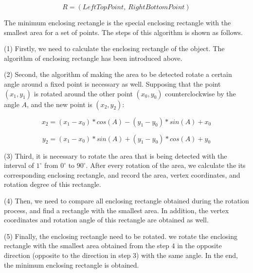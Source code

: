 \documentclass[22pt, UTF8]{article}
\numberwithin{figure}{section}
\numberwithin{table}{section}
\numberwithin{equation}{section} %
\begin{document}
\vspace{-4mm} %
\begin{equation} %
R = (LeftTopPoint,\ RightBottomPoint)
\end{equation}

\setlength\parindent{2em} The minimum enclosing rectangle is the special enclosing rectangle with the smallest area for a set of points. The steps of this algorithm is shown as follows.

\setlength\parindent{2em} (1) Firstly, we need to calculate the enclosing rectangle of the object. The algorithm of enclosing rectangle has been introduced above.

\setlength\parindent{2em} (2) Second, the algorithm of making the area to be detected rotate a certain angle around a fixed point is necessary as well. Supposing that the point $(x_{1}, y_{1})$ is rotated around the other point $(x_{0}, y_{0})$ counterclockwise by the angle $A$, and the new point is $(x_{2}, y_{2})$:

\vspace{-4mm} %
\begin{equation}
x_{2} = (x_{1} - x_{0}) * cos(A) - (y_{1} - y_{0}) * sin(A) + x_{0}
\end{equation}

\vspace{-4mm} %
\begin{equation}
y_{2} = (x_{1} - x_{0}) * sin(A) + (y_{1} - y_{0}) * cos(A) + y_{0}
\end{equation}

\setlength\parindent{2em} (3) Third, it is necessary to rotate the area that is being detected with the interval of $1^{\circ}$ from $0^{\circ}$ to $90^{\circ}$. After every rotation of the area, we calculate the its corresponding enclosing rectangle, and record the area, vertex coordinates, and rotation degree of this rectangle.

\setlength\parindent{2em} (4) Then, we need to compare all enclosing rectangle obtained during the rotation process, and find a rectangle with the smallest area. In addition, the vertex coordinates and rotation angle of this rectangle are obtained as well.

(5) Finally, the enclosing rectangle need to be rotated. we rotate the enclosing rectangle with the smallest area obtained from the step 4 in the opposite direction (opposite to the direction in step 3) with the same angle. In the end, the minimum enclosing rectangle is obtained.
\end{document}
